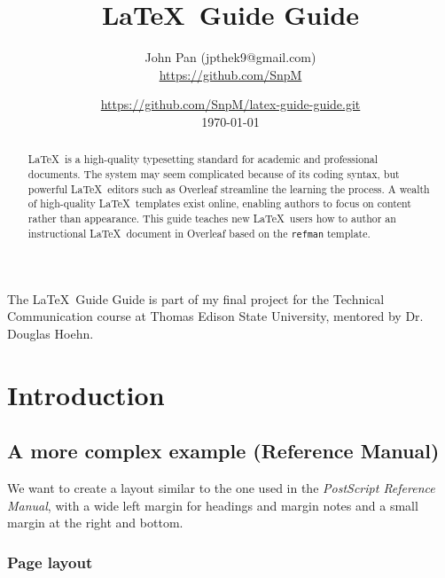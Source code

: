 \documentclass[twoside,a4paper]{refart}
\title{\LaTeX\ Guide Guide}
\author{
John Pan (jpthek9@gmail.com)\\
\url{https://github.com/SnpM}
}
\date{\url{https://github.com/SnpM/latex-guide-guide.git}\\\today}
\begin{document}
\maketitle

\begin{abstract}
         \LaTeX\ is a high-quality typesetting standard for academic and professional documents. The system may seem complicated because of its coding syntax, but powerful \LaTeX\ editors such as Overleaf streamline the learning the process. A wealth of high-quality \LaTeX\ templates exist online, enabling authors to focus on content rather than appearance. This guide teaches new \LaTeX\ users how to author an instructional \LaTeX\ document in Overleaf based on the \texttt{refman} template.
\end{abstract}

The \LaTeX\ Guide Guide is part of my final project for the Technical Communication course at Thomas Edison State University, mentored by Dr. Douglas Hoehn. 

\tableofcontents

\newpage


\newcommand{\sectionbreak}{\clearpage}
\section{Introduction}





\subsection{A more complex example (Reference Manual)}
\label{refmanex}

We want to create a layout similar to the one used in the \textit{PostScript 
Reference Manual}, with a wide left margin for headings and margin 
notes and a small margin at the right and bottom.

\subsubsection{Page layout}
\end{document}
